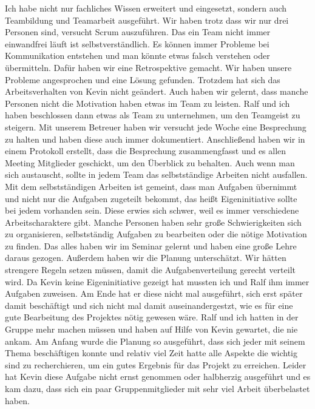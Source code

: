 \noindent Ich habe nicht nur fachliches Wissen erweitert und eingesetzt, sondern auch Teambildung und Teamarbeit ausgeführt. 
Wir haben trotz dass wir nur drei Personen sind, versucht Scrum auszuführen.
Das ein Team nicht immer einwandfrei läuft ist selbstverständlich. 
Es können immer Probleme bei Kommunikation entstehen und man könnte etwas falsch verstehen oder übermitteln. 
Dafür haben wir eine Retrospektive gemacht. Wir haben unsere Probleme angesprochen und eine Lösung gefunden. 
Trotzdem hat sich das Arbeitsverhalten von Kevin nicht geändert.
Auch haben wir gelernt, dass manche Personen nicht die Motivation haben etwas im Team zu leisten. 
Ralf und ich haben beschlossen dann etwas als Team zu unternehmen, um den Teamgeist zu steigern. 
Mit unserem Betreuer haben wir versucht jede Woche eine Besprechung zu halten und haben diese auch immer dokumentiert. 
Anschließend haben wir in einem Protokoll erstellt, dass die Besprechung zusammengfasst und es allen Meeting Mitglieder geschickt, um den Überblick zu behalten. 
Auch wenn man sich austauscht, sollte in jedem Team das selbstständige Arbeiten nicht ausfallen. 
Mit dem selbstständigen Arbeiten ist gemeint, dass man Aufgaben übernimmt und nicht nur die Aufgaben zugeteilt bekommt, das heißt Eigeninitiative sollte bei jedem vorhanden sein. 
Diese erwies sich schwer, weil es immer verschiedene Arbeitscharaktere gibt. 
Manche Personen haben sehr große Schwierigkeiten sich zu organisieren, selbstständig Aufgaben zu bearbeiten oder die nötige Motivation zu finden. 
Das alles haben wir im Seminar gelernt und haben eine große Lehre daraus gezogen.\newline
Außerdem haben wir die Planung unterschätzt. Wir hätten strengere Regeln setzen müssen, damit die Aufgabenverteilung gerecht verteilt wird. 
Da Kevin keine Eigeninitiative gezeigt hat mussten ich und Ralf ihm immer Aufgaben zuweisen. 
Am Ende hat er diese nicht mal ausgeführt, sich erst später damit beschäftigt und sich nicht mal damit auseinandergestzt, wie es für eine gute Bearbeitung des Projektes nötig gewesen wäre.
Ralf und ich hatten in der Gruppe mehr machen müssen und haben auf Hilfe von Kevin gewartet, die nie ankam. 
Am Anfang wurde die Planung so ausgeführt, dass sich jeder mit seinem Thema beschäftigen konnte und
relativ viel Zeit hatte alle Aspekte die wichtig sind zu recherchieren, um ein gutes Ergebnis für das Projekt zu erreichen.
Leider hat Kevin diese Aufgabe nicht ernst genommen oder halbherzig ausgeführt und es kam dazu, dass sich ein paar Gruppenmitglieder mit sehr viel Arbeit überbelastet haben. 
